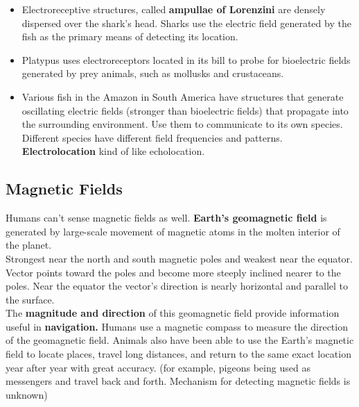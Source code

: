 \documentclass{article}
\begin{document}
\begin{itemize}
    \item Electroreceptive structures, called \textbf{ampullae of Lorenzini} are densely dispersed over the shark's head. Sharks use the electric field generated by the fish as the primary means of detecting its location. 
    \item Platypus uses electroreceptors located in its bill to probe for bioelectric fields generated by prey animals, such as mollusks and crustaceans.
    \item Various fish in the Amazon in South America have structures that generate oscillating electric fields (stronger than bioelectric fields) that propagate into the surrounding environment. Use them to communicate to its own species. Different species have different field frequencies and patterns. \textbf{Electrolocation} kind of like echolocation. 
\end{itemize}

\subsection{Magnetic Fields}
Humans can't sense magnetic fields as well. \textbf{Earth's geomagnetic field} is generated by large-scale movement of magnetic atoms in the molten interior of the planet. \\

Strongest near the north and south magnetic poles and weakest near the equator. Vector points toward the poles and become more steeply inclined nearer to the poles. Near the equator the vector's direction is nearly horizontal and parallel to the surface. \\

The \textbf{magnitude and direction} of this geomagnetic field provide information useful in \textbf{navigation.} Humans use a magnetic compass to measure the direction of the geomagnetic field. Animals also have been able to use the Earth's magnetic field to locate places, travel long distances, and return to the same exact location year after year with great accuracy. (for example, pigeons being used as messengers and travel back and forth. Mechanism for detecting magnetic fields is unknown)\\
\end{document}
